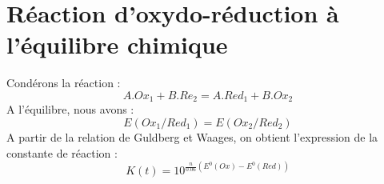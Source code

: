 \section{Réaction d'oxydo-réduction à l'équilibre chimique}
Condérons la réaction :
$$A.Ox_1+B.Re_2 = A.Red_1+B.Ox_2$$
A l'équilibre, nous avons : 
$$E(Ox_1/Red_1) = E(Ox_2/Red_2)$$
A partir de la relation de Guldberg et Waages, on obtient l'expression de la constante de réaction :
$$K(t) = 10^{\frac{n}{0.06}(E^0(Ox)-E^0(Red))}$$
